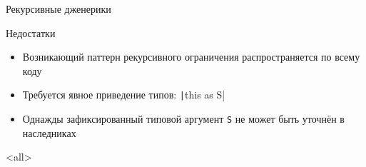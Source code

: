 \documentclass[aspectratio=169,usenames,dvipsnames]{beamer}
\begin{document}
\begin{frame}[fragile]{Рекурсивные дженерики}
        \pause

        \begin{block}{Недостатки}
            \begin{itemize}
                \item Возникающий паттерн рекурсивного ограничения распространяется по всему коду
                \item Требуется явное приведение типов: \texttt|this as S|
                \item Однажды зафиксированный типовой аргумент \texttt{S} не может быть уточнён в наследниках
            \end{itemize}
        \end{block}
    \end{frame}
    \mode*

    \mode<all>
\end{document}
